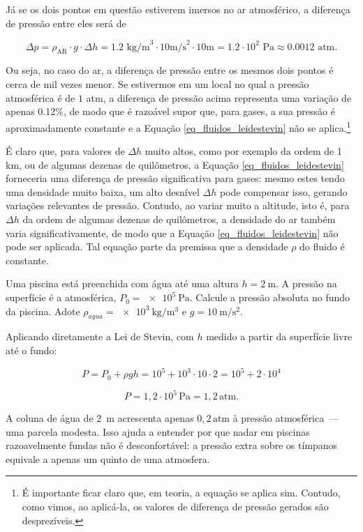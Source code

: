  Já se os dois pontos em questão estiverem imersos no ar atmosférico, a diferença de pressão entre eles será de 

 $$ \Delta p = \rho_\text{AR} \cdot g \cdot \Delta h  = 1.2 \text{ kg/m}^3 \cdot 10 \text{m/s}^2 \cdot 10 \text{m} = 1.2 \cdot 10^2 \text{ Pa} \approx 0.0012 \text{ atm.}$$

 Ou seja, no caso do ar, a diferença de pressão entre os mesmos dois pontos é cerca de mil vezes menor. Se estivermos em um local no qual a pressão atmosférica é de $1$ atm, a diferença de pressão acima representa uma variação de apenas 0.12\%, de modo que é razoável supor que, para gases, a sua pressão é aproximadamente constante e a Equação \eqref{eq_fluidos_leidestevin} não se aplica.\footnote{É importante ficar claro que, em teoria, a equação se aplica sim. Contudo, como vimos, ao aplicá-la, os valores de diferença de pressão gerados são desprezíveis.}

 É claro que, para valores de $\Delta h$ muito altos, como por exemplo da ordem de 1 km, ou de algumas dezenas de quilômetros, a Equação \eqref{eq_fluidos_leidestevin} forneceria uma diferença de pressão significativa para gases: mesmo estes tendo uma densidade muito baixa, um alto desnível $\Delta h$ pode compensar isso, gerando variações relevantes de pressão. Contudo, ao variar muito a altitude, isto é, para $\Delta h$ da ordem de algumas dezenas de quilômetros, a densidade do ar também varia significativamente, de modo que a Equação \eqref{eq_fluidos_leidestevin} não pode ser aplicada. Tal equação parte da premissa que a densidade $\rho$ do fluido é constante.


\vspace{0.3cm}



\begin{exemplo}[Nível I]\label{exemplo_fluidos_stevinex01}

Uma piscina está preenchida com água até uma altura $h = \SI{2}{\metre}$.
A pressão na superfície é a atmosférica, $P_0 = \SI{e5}{\pascal}$.
Calcule a pressão absoluta no fundo da piscina. Adote
$\rho_{\!agua} = \SI{e3}{\kilo\gram\per\metre\cubed}$ e
$g = \SI{10}{\metre\per\second\squared}$.

\resolucao

Aplicando diretamente a Lei de Stevin, com $h$ medido a partir da
superfície livre até o fundo:
 
\begin{equation*}
    P = P_0 + \rho g h
    = 10^5 + 10^3 \cdot 10 \cdot 2
    = 10^5 + 2 \cdot 10^4
\end{equation*}
 
\begin{equation*}
    \boxed{P = 1{,}2 \cdot 10^5\,\si{\pascal} = 1{,}2\,\text{atm.}}
\end{equation*}
 
A coluna de água de \SI{2}{\metre} acrescenta apenas $0{,}2\,\text{atm}$
à pressão atmosférica~--- uma parcela modesta. Isso ajuda a entender
por que nadar em piscinas razoavelmente fundas não é desconfortável:
a pressão extra sobre os tímpanos equivale a apenas um quinto de uma
atmosfera.

\end{exemplo}


